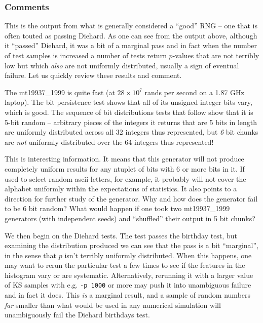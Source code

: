 \documentclass[12pt]{article}
\begin{document}
\subsubsection{Comments}

This is the output from what is generally considered a ``good'' RNG --
one that is often touted as passing Diehard.  As one can see from the
output above, although it ``passed'' Diehard, it was a bit of a marginal
pass and in fact when the number of test samples is increased a number
of tests return $p$-values that are not terribly low but which {\em
also} are not uniformly distributed, usually a sign of eventual failure.
Let us quickly review these results and comment.

The mt19937\_1999 is quite fast (at $28\times10^7$ rands per second on a
1.87 GHz laptop).  The bit persistence test shows that all of its
unsigned integer bits vary, which is good.  The sequence of bit
distributions tests that follow show that it is 5-bit random --
arbitrary pieces of the integers it returns that are 5 bits in length
are uniformly distributed across all 32 integers thus represented, but
{\em 6} bit chunks are {\em not} uniformly distributed over the 64
integers thus represented!  

This is interesting information.  It means that this generator will not
produce completely uniform results for any ntuplet of bits with 6 or
more bits in it.  If used to select random ascii letters, for example,
it probably will not cover the alphabet uniformly within the
expectations of statistics.  It also points to a direction for further
study of the generator.  Why and how does the generator fail to be 6 bit
random?  What would happen if one took two mt19937\_1999 generators
(with independent seeds) and ``shuffled'' their output in 5 bit chunks?

We then begin on the Diehard tests.  The test passes the birthday test,
but examining the distribution produced we can see that the pass is a
bit ``marginal'', in the sense that $p$ isn't terribly uniformly
distributed.  When this happens, one may want to rerun the particular
test a few times to see if the features in the histogram vary or are
systematic.  Alternatively, rerunning it with a larger value of KS
samples with e.g. {\tt -p 1000} or more may push it into unambiguous
failure and in fact it does.  This {\em is} a marginal result, and a
sample of random numbers {\em far} smaller than what would be used in
any numerical simulation will unambiguously fail the Diehard birthdays
test.
\end{document}
